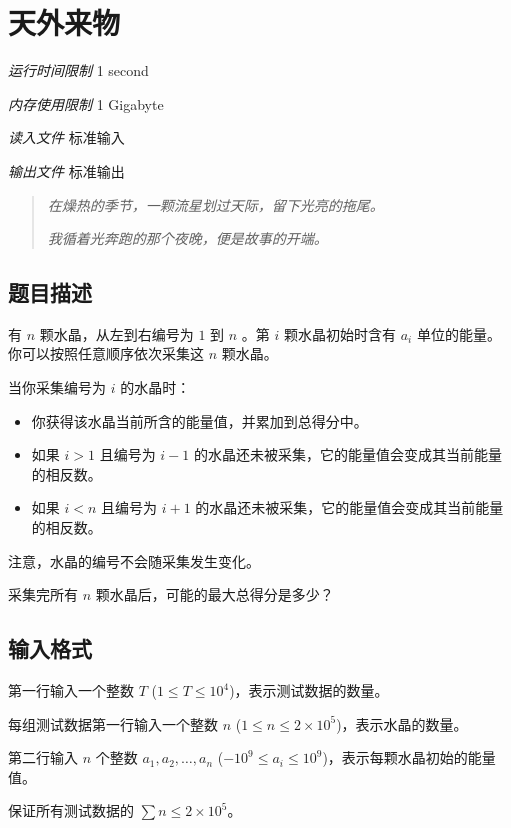 \section[I. 天外来物]{ 天外来物}

\textit{运行时间限制}   1 second

\textit{内存使用限制} 1 Gigabyte

\textit{读入文件} \qquad 标准输入

\textit{输出文件} \qquad 标准输出


\begin{quote}
	\textit{在燥热的季节，一颗流星划过天际，留下光亮的拖尾。}
	
	\textit{我循着光奔跑的那个夜晚，便是故事的开端。}
\end{quote}

\subsection{题目描述}

有 $n$ 颗水晶，从左到右编号为 $1$ 到 $n$ 。第 $i$ 颗水晶初始时含有 $a_i$ 单位的能量。你可以按照任意顺序依次采集这 $n$ 颗水晶。

当你采集编号为 $i$ 的水晶时：

\begin{itemize}
	\item 你获得该水晶当前所含的能量值，并累加到总得分中。
	\item 如果 $i > 1$ 且编号为 $i - 1$ 的水晶还未被采集，它的能量值会变成其当前能量的相反数。
	\item 如果 $i < n$ 且编号为 $i + 1$ 的水晶还未被采集，它的能量值会变成其当前能量的相反数。
\end{itemize}

注意，水晶的编号不会随采集发生变化。

采集完所有 $n$ 颗水晶后，可能的最大总得分是多少？

\subsection{输入格式}

第一行输入一个整数 $T$ ($1 \le T \le 10^4$)，表示测试数据的数量。

每组测试数据第一行输入一个整数 $n$ ($1 \le n \le 2 \times 10^5$)，表示水晶的数量。

第二行输入 $n$ 个整数 $a_1, a_2, \ldots, a_n$ ($-10^9 \le a_i \le 10^9$)，表示每颗水晶初始的能量值。

保证所有测试数据的 $\sum n \le 2 \times 10^5$。

